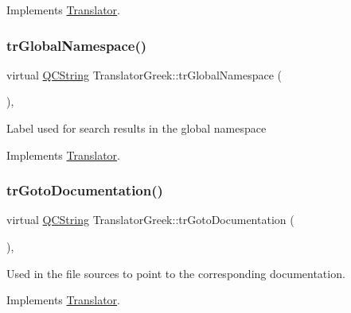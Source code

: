 Implements \mbox{\hyperlink{class_translator}{Translator}}.

\mbox{\label{class_translator_greek_a7570d2ce3b530c2719b53bf4e1de6607}} 
\subsubsection{\texorpdfstring{trGlobalNamespace()}{trGlobalNamespace()}}
{\footnotesize\ttfamily virtual \mbox{\hyperlink{class_q_c_string}{Q\+C\+String}} Translator\+Greek\+::tr\+Global\+Namespace (\begin{DoxyParamCaption}{ }\end{DoxyParamCaption})\hspace{0.3cm}{\ttfamily [inline]}, {\ttfamily [virtual]}}

Label used for search results in the global namespace 

Implements \mbox{\hyperlink{class_translator}{Translator}}.

\mbox{\label{class_translator_greek_ada7b8649bb7ee14feafe5ed80064e83a}} 
\subsubsection{\texorpdfstring{trGotoDocumentation()}{trGotoDocumentation()}}
{\footnotesize\ttfamily virtual \mbox{\hyperlink{class_q_c_string}{Q\+C\+String}} Translator\+Greek\+::tr\+Goto\+Documentation (\begin{DoxyParamCaption}{ }\end{DoxyParamCaption})\hspace{0.3cm}{\ttfamily [inline]}, {\ttfamily [virtual]}}

Used in the file sources to point to the corresponding documentation. 

Implements \mbox{\hyperlink{class_translator}{Translator}}.

\mbox{\label{class_translator_greek_aea1f7a75598561ebdcc8b400451548e0}} 
